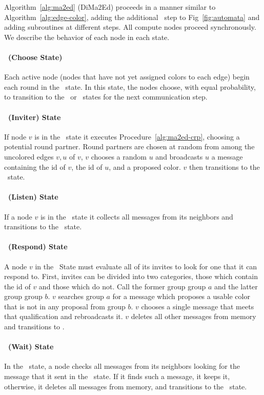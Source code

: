 \label{sec:dima2ed-description}

Algorithm~\ref{alg:ma2ed} (DiMa2Ed) proceeds in a manner similar to Algorithm~\ref{alg:edge-color}, adding the additional \cEd\ step to Fig~\ref{fig:automata} and adding subroutines at different steps. All compute nodes proceed synchronously. We describe the behavior of each node in each state.

\paragraph{\cCd\ (Choose State)}
Each active node (nodes that have not yet assigned colors to each edge) begin each round in the \cCd\ state. In this state, the nodes choose, with equal probability, to transition to the \cId\ or \cLd\ states for the next communication step.

\paragraph{\cId\ (Inviter) State}
If node $v$ is in the \cId\ state it executes Procedure~\ref{alg:ma2ed-crp}, choosing a potential round partner. Round partners are chosen at random from among the uncolored edges $v,u$ of $v$, $v$ chooses a random $u$ and broadcasts $u$ a message containing the id of $v$, the id of $u$, and a proposed color. $v$ then transitions to the \cWd\ state.

\paragraph{\cLd\ (Listen) State}
If a node $v$ is in the \cLd\ state it collects all messages from its neighbors and transitions to the \cRd\ state. 

\paragraph{\cRd\ (Respond) State}
A node $v$ in the \cRd\ State must evaluate all of its invites to look for one that it can respond to. First, invites can be divided into two categories, those which contain the id of $v$ and those which do not. Call the former group group $a$ and the latter group group $b$. $v$ searches group $a$ for a message which proposes a usable color that is not in any proposal from group $b$. $v$ chooses a single message that meets that qualification and rebroadcasts it. $v$ deletes all other messages from memory and transitions to \cUd.

\paragraph{\cWd\ (Wait) State}
In the \cWd\ state, a node checks all messages from its neighbors looking for the message that it sent in the \cId\ state. If it finds such a message, it keeps it, otherwise, it deletes all messages from memory, and transitions to the \cUd\ state.

